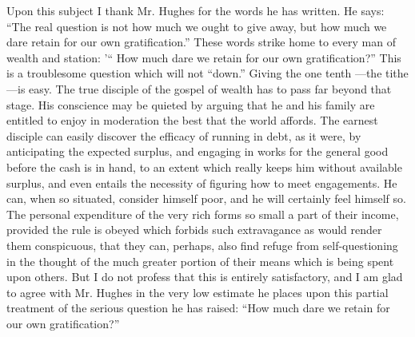 \documentclass[11pt,openany]{book}
\begin{document}
Upon this subject I thank Mr. Hughes for the words he has written. He says: ``The real question is not how much we ought to give away, but how much we dare retain for our own gratification.'' These words strike home to every man of wealth and station: '`` How much dare we retain for our own gratification?'' This is a troublesome question which will not ``down.'' Giving the one tenth ---the tithe ---is easy. The true disciple of the gospel of wealth has to pass far beyond that stage. His conscience may be quieted by arguing that he and his family are entitled to enjoy in moderation the best that the world affords. The earnest disciple can easily discover the efficacy of running in debt, as it were, by anticipating the expected surplus, and engaging in works for the general good before the cash is in hand, to an extent which really keeps him without available surplus, and even entails the necessity of figuring how to meet engagements. He can, when so situated, consider himself poor, and he will certainly feel himself so. The personal expenditure of the very rich forms so small a part of their income, provided the rule is obeyed which forbids such extravagance as would render them conspicuous, that they can, perhaps, also find refuge from self-questioning in the thought of the much greater portion of their means which is being spent upon others. But I do not profess that this is entirely satisfactory, and I am glad to agree with Mr. Hughes in the very low estimate he places upon this partial treatment of the serious question he has raised: ``How much dare we retain for our own gratification?''
\end{document}
